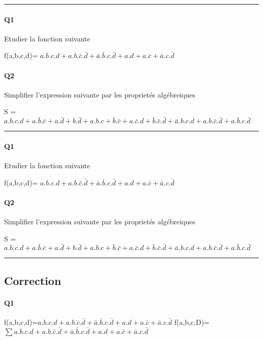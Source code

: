 \hrule width 1\linewidth
\paragraph{Q1}

Etudier la fonction suivante

f(a,b,c,d)= $ a.b.c.d + a.b.\bar c.\bar d + \bar a.\bar b.c.\bar d  +  a.d + a.\bar c + \bar a.c.\bar d $

\paragraph{Q2}

Simplifier l'expression suivante par les proprietés algébreiques 

S = $ a.b.c.d + a.\bar b.\bar c  +  a.\bar d + b.\bar d + a.b.c + \bar b.\bar c  +  a.\bar c.d + \bar b.\bar c.\bar d  +  \bar a.b.c.d + a.b.\bar c.\bar d + a.\bar b.c.\bar d $

\hrule width 1\linewidth
\paragraph{Q1}

Etudier la fonction suivante

f(a,b,c,d)= $ a.b.c.d + a.b.\bar c.\bar d + \bar a.\bar b.c.\bar d  +  a.d + a.\bar c + \bar a.c.\bar d $

\paragraph{Q2}

Simplifier l'expression suivante par les proprietés algébreiques 

S = $ a.b.c.d + a.\bar b.\bar c  +  a.\bar d + b.\bar d + a.b.c + \bar b.\bar c  +  a.\bar c.d + \bar b.\bar c.\bar d  +  \bar a.b.c.d + a.b.\bar c.\bar d + a.\bar b.c.\bar d $

\hrule width 1\linewidth\pagebreak
\subsection{Correction}

\paragraph{Q1}

f(a,b,c,d)=$ a.b.c.d + a.b.\bar c.\bar d + \bar a.\bar b.c.\bar d  +  a.d + a.\bar c + \bar a.c.\bar d $
f(a,b,c,D)=$ \sum a.b.c.d + a.b.\bar c.\bar d + \bar a.\bar b.c.\bar d  +  a.d + a.\bar c + \bar a.c.\bar d $ 

